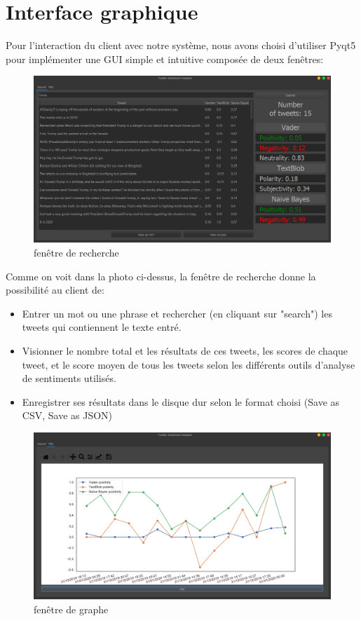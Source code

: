 \section{Interface graphique}
Pour l'interaction du client avec notre système, nous avons choisi d'utiliser Pyqt5 pour implémenter une GUI simple et intuitive composée de deux fenêtres:
\begin{figure}[H]
    \centering
    \includegraphics[width=\textwidth]{realisation/assets/1.png}
    \caption{fenêtre de recherche}
    \label{fig:my_label}
\end{figure}
Comme on voit dans la photo ci-dessus, la fenêtre de recherche donne la possibilité au client de:
\begin{itemize}
    \item Entrer un mot ou une phrase et rechercher (en cliquant sur "search") les tweets qui contiennent le texte entré.
    \item Visionner le nombre total et les résultats de ces tweets, les scores de chaque tweet, et le score moyen de tous les tweets selon les différents outils d'analyse de sentiments utilisés.
    \item Enregistrer ses résultats dans le disque dur selon le format choisi (Save as CSV, Save as JSON) 
\end{itemize}
\begin{figure}[H]
    \centering
    \includegraphics[width=\textwidth]{realisation/assets/2.png}
    \caption{fenêtre de graphe}
    \label{fig:my_label}
\end{figure}
